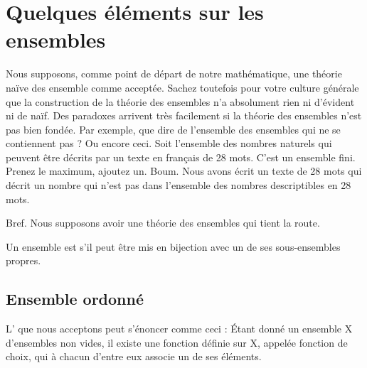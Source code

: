 
\section{Quelques éléments sur les ensembles}

Nous supposons, comme point de départ de notre mathématique, une théorie naïve des ensemble comme acceptée. Sachez toutefois pour votre culture générale que la construction de la théorie des ensembles n'a absolument rien ni d'évident ni de naïf. Des paradoxes arrivent très facilement si la théorie des ensembles n'est pas bien fondée. Par exemple, que dire de l'ensemble des ensembles qui ne se contiennent pas ? Ou encore ceci. Soit l'ensemble des nombres naturels qui peuvent être décrits par un texte en français de 28 mots. C'est un ensemble fini. Prenez le maximum, ajoutez un. Boum. Nous avons écrit un texte de 28 mots qui décrit un nombre qui n'est pas dans l'ensemble des nombres descriptibles en 28 mots.

Bref. Nous supposons avoir une théorie des ensembles qui tient la route.

\begin{definition}      \label{DefEOZLooUMCzZR}
    Un ensemble est  s'il peut être mis en bijection avec un de ses sous-ensembles propres.
\end{definition}

\subsection{Ensemble ordonné}

\begin{normaltext}\label{NORooLMBYooYjUoju}
L' que nous acceptons peut s'énoncer comme ceci\cite{ooKLIXooHbpufL} : Étant donné un ensemble X d'ensembles non vides, il existe une fonction définie sur X, appelée fonction de choix, qui à chacun d'entre eux associe un de ses éléments. 
\end{normaltext}

